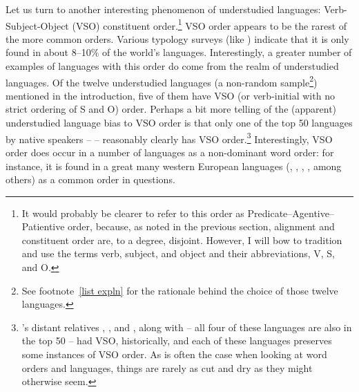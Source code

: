 \documentclass[output=paper,biblatex,babelshorthands,newtxmath,draftmode,colorlinks,citecolor=brown]{langscibook}
\begin{document}
Let us turn to another interesting phenomenon of understudied languages: Verb-Subject-Object (VSO) constituent order.\footnote{It would probably be clearer to refer to this order as Predicate--Agentive--Patientive order, because, as noted in the previous section, alignment and constituent order are, to a degree, disjoint. However, I will bow to tradition and use the terms verb, subject, and object and their abbreviations, V, S, and O.} VSO order appears to be the rarest of the more common orders. Various typology surveys (like \citealt{dryerWALSwordorder}) indicate that it is only found in about 8--10\% of the world's languages. Interestingly, a greater number of examples of languages with this order do come from the realm of understudied languages. Of the twelve understudied languages (a non-random sample\footnote{See footnote~\ref{list expln} for the rationale behind the choice of those twelve languages.}) mentioned in the introduction, five of them have VSO (or verb-initial with no strict ordering of S and O) order. Perhaps a bit more telling of the (apparent) understudied language bias to VSO order is that only one of the top 50 languages by native speakers --  -- reasonably clearly has VSO order.\footnote{'s distant  relatives , , and , along with  -- all four of these languages are also in the top 50 -- had VSO, historically, and each of these languages preserves some instances of VSO order. As is often the case when looking at word orders and languages, things are rarely as cut and dry as they might otherwise seem.} Interestingly, VSO order does occur in a number of languages as a non-dominant word order: for instance, it is found in a great many western European languages (, , , , among others) as a common order in questions.
\end{document}
